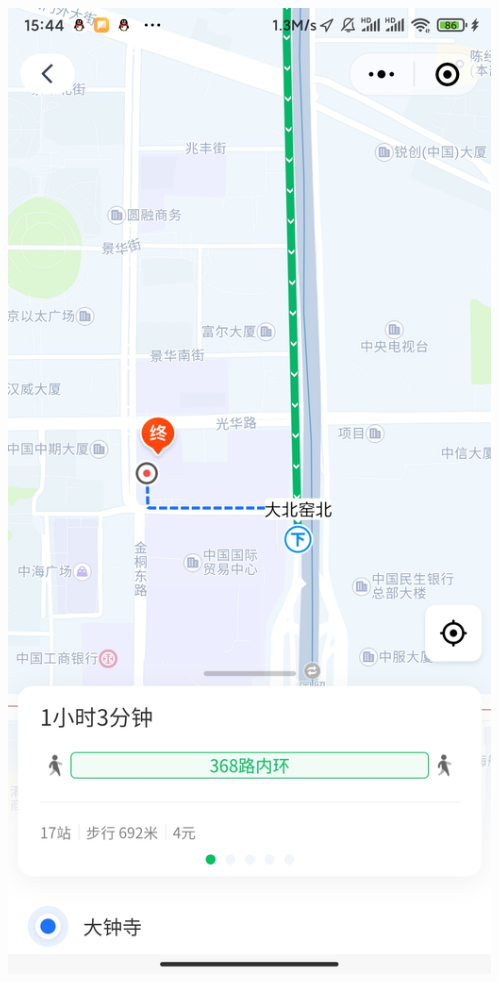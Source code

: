 \documentclass{beamer}
\begin{document}
\begin{frame}
    \begin{columns}
        \begin{block}{}
            \includegraphics[width=0.7\linewidth]{figure/map_example-tencent-detail.jpg}
        \end{block}
        \begin{block}{}

\end{block}
\end{columns}
\end{frame}
\end{document}
